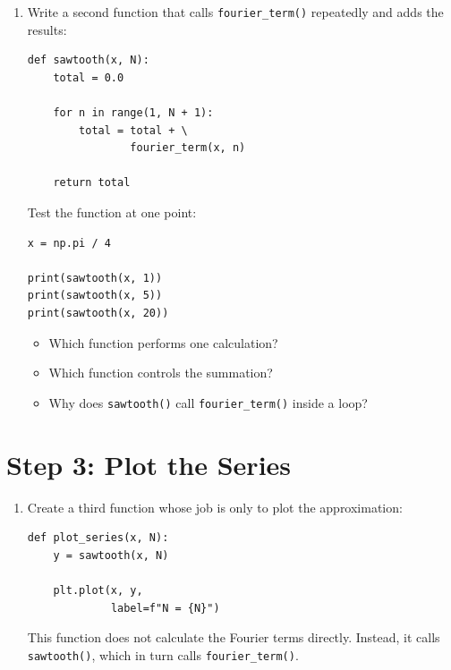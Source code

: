 \documentclass{article}
\begin{document}
\begin{enumerate}

\item Write a second function that calls
\texttt{fourier\_term()} repeatedly and adds the results:

\begin{verbatim}
def sawtooth(x, N):
    total = 0.0

    for n in range(1, N + 1):
        total = total + \
                fourier_term(x, n)

    return total
\end{verbatim}

Test the function at one point:

\begin{verbatim}
x = np.pi / 4

print(sawtooth(x, 1))
print(sawtooth(x, 5))
print(sawtooth(x, 20))
\end{verbatim}

\begin{itemize}
\item Which function performs one calculation?
\item Which function controls the summation?
\item Why does \texttt{sawtooth()} call
\texttt{fourier\_term()} inside a loop?
\end{itemize}

\end{enumerate}


\section{Step 3: Plot the Series}

\begin{enumerate}

\item Create a third function whose job is only to plot the
approximation:

\begin{verbatim}
def plot_series(x, N):
    y = sawtooth(x, N)

    plt.plot(x, y,
             label=f"N = {N}")
\end{verbatim}

This function does not calculate the Fourier terms directly.
Instead, it calls \texttt{sawtooth()}, which in turn calls
\texttt{fourier\_term()}.

\end{enumerate}
\end{document}
